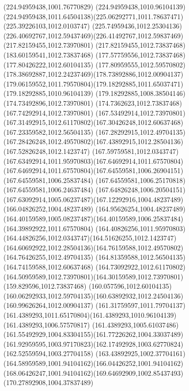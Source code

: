 {{	\lineto(224.94959438,1001.76770829)
	\lineto(224.94959438,1010.96104139)
	\curveto(224.94959438,1011.64504138)(225.06292771,1011.78637471)(225.39226103,1012.0103747)
	\curveto(225.74959436,1012.25304136)(226.40692767,1012.59437469)(226.41492767,1012.59837469)
	\closepath
	\moveto(217.82159455,1012.73970801)
	\lineto(217.82159455,1012.73837468)
	\closepath
	\moveto(183.60159541,1012.73837468)
	\lineto(177.57759556,1012.73837468)
	\lineto(177.80426222,1012.60104135)
	\curveto(177.80959555,1012.59570802)(178.38692887,1012.24237469)(178.73892886,1012.00904137)
	\curveto(179.06159552,1011.79570804)(179.18292885,1011.65037471)(179.18292885,1010.96104139)
	\lineto(179.18292885,1008.38504146)
	\lineto(174.73492896,1012.73970801)
	\lineto(174.7362623,1012.73837468)
	\lineto(167.74292914,1012.73970801)
	\curveto(167.53492914,1012.73970801)(167.31492915,1012.61170802)(167.30426248,1012.60637468)
	\lineto(167.23359582,1012.56504135)
	\lineto(167.28292915,1012.49704135)
	\curveto(167.28426248,1012.49570802)(167.43892915,1012.28504136)(167.52826248,1012.1423747)
	\curveto(167.59759581,1012.0343747)(167.63492914,1011.95970803)(167.64692914,1011.67570804)
	\curveto(167.64692914,1011.67570804)(167.64559581,1006.26904151)(167.64559581,1006.25837484)
	\lineto(167.64559581,1006.25170818)
	\lineto(167.64559581,1006.24637484)
	\lineto(167.64826248,1006.20504151)
	\curveto(167.63092914,1005.06237487)(167.12292916,1004.48237489)(166.04826252,1004.48237489)
	\curveto(164.95626254,1004.48237489)(164.40159589,1005.08237487)(164.40159589,1006.25837484)
	\lineto(164.39892922,1011.67570804)
	\curveto(164.40826256,1011.95970803)(164.44826256,1012.0343747)(164.51626255,1012.1423747)
	\curveto(164.60692922,1012.28504136)(164.76159588,1012.49570802)(164.76426255,1012.49704135)
	\lineto(164.81359588,1012.56504135)
	\lineto(164.74159588,1012.60637468)
	\curveto(164.73092922,1012.61170802)(164.50959589,1012.73970801)(164.30159589,1012.73970801)
	\lineto(159.829596,1012.73837468)
	\lineto(160.057596,1012.60104135)
	\curveto(160.06292933,1012.59704135)(160.63892932,1012.24504136)(160.99626264,1012.00904137)
	\curveto(161.31759597,1011.79704137)(161.4389293,1011.65170804)(161.4389293,1010.96104139)
	\lineto(161.4389293,1006.57570817)
	\curveto(161.4389293,1005.61037486)(161.55492929,1004.83304155)(161.77226262,1004.33037489)
	\curveto(161.92959595,1003.97170823)(162.17492928,1003.62770824)(162.52559594,1003.27704158)
	\curveto(163.43892925,1002.37704161)(164.58959589,1001.94104162)(166.04426252,1001.94104162)
	\curveto(168.06426247,1001.94104162)(169.64692909,1002.85437493)(170.27892908,1004.37837489)
}}
